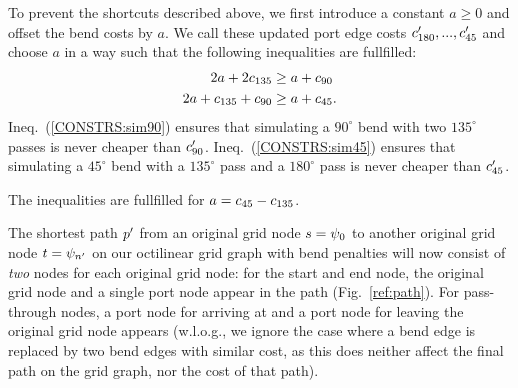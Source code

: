 \documentclass[sigconf]{acmart}
\begin{document}
To prevent the shortcuts described above, we first introduce a constant $a \geq 0$ and offset the bend costs by $a$.
We call these updated port edge costs $c'_{180}, ..., c'_{45}$ and choose $a$ in a way such that the following inequalities are fullfilled:
%
\begin{align}
	2a + 2c_{135} &\geq a + c_{90} \label{CONSTRS:sim90}\\
	2a + c_{135} + c_{90} &\geq a + c_{45}\label{CONSTRS:sim45}.
\end{align}
Ineq.~(\ref{CONSTRS:sim90}) ensures that simulating a $90^{\circ}$ bend with two $135^{\circ}$ passes is never cheaper than $c'_{90}$.
Ineq.~(\ref{CONSTRS:sim45}) ensures that simulating a $45^{\circ}$ bend with a $135^{\circ}$ pass and a $180^{\circ}$ pass is never cheaper than $c'_{45}$.

The inequalities are fullfilled for $a = c_{45} - c_{135}$.

The shortest path $p'$ from an original grid node $s = \psi_0$ to another original grid node $t=\psi_{n'}$ on our octilinear grid graph with bend penalties will now consist of \emph{two} nodes for each original grid node: for the start and end node, the original grid node and a single port node appear in the path (Fig.~\ref{ref:path}).
For pass-through nodes, a port node for arriving at and a port node for leaving the original grid node appears (w.l.o.g., we ignore the case where a bend edge is replaced by two bend edges with similar cost, as this does neither affect the final path on the grid graph, nor the cost of that path).
\end{document}
